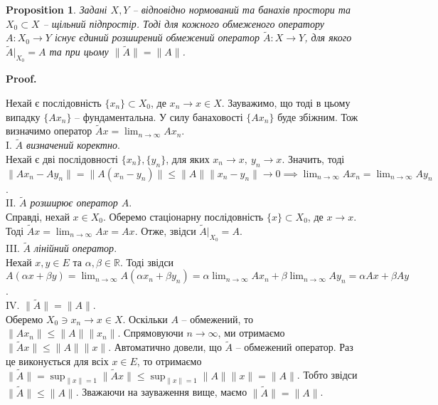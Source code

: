 \documentclass[a4paper, 10pt]{article}
\makeatletter
\theoremstyle{theoremdd}
\theoremstyle{theoremdd}
\theoremstyle{theoremdd}
\theoremstyle{theoremdd}
\theoremstyle{theoremdd}
\newtheorem{proposition}[theorem]{Proposition}
\theoremstyle{theoremdd}
\theoremstyle{theoremdd}
\theoremstyle{theoremdd}
\renewenvironment{proof}[1][Proof.\\]{\par
\pushQED{\hfill \qed}%
\normalfont \topsep6\p@\@plus6\p@\relax
\trivlist
\item\relax
{\bfseries
#1\@addpunct{.}}\hspace\labelsep\ignorespaces
}{%
\popQED\endtrivlist\@endpefalse
}
\makeatother
\begin{document}
\begin{proposition}
Задані $X,Y$ -- відповідно нормований та банахів простори та $X_0 \subset X$ -- щільний підпростір. Тоді для кожного обмеженого оператору $A \colon X_0 \to Y$ існує єдиний розширений обмежений оператор $\tilde{A} \colon X \to Y$, для якого $\tilde{A}|_{X_0} = A$ та при цьому $\|\tilde{A}\| = \|A\|$.
\end{proposition}

\begin{proof}
Нехай є послідовність $\{x_n\} \subset X_0$, де $x_n \to x \in X$. Зауважимо, що тоді в цьому випадку $\{Ax_n\}$ -- фундаментальна. У силу банаховості $\{Ax_n\}$ буде збіжним. Тож визначимо оператор $\tilde{A}x = \displaystyle\lim_{n \to \infty} Ax_n$.\\
I. \textit{$\tilde{A}$ визначений коректно}.\\
Нехай є дві послідовності $\{x_n\},\{y_n\}$, для яких $x_n \to x,\ y_n \to x$. Значить, тоді\\
$\|Ax_n - Ay_n\| = \|A(x_n-y_n)\| \leq \|A\| \|x_n-y_n\| \to 0 \implies \displaystyle\lim_{n \to \infty} Ax_n = \lim_{n \to \infty} Ay_n$.
\bigskip \\
II. \textit{$\tilde{A}$ розширює оператор $A$}.\\
Справді, нехай $x \in X_0$. Оберемо стаціонарну послідовність $\{x\} \subset X_0$, де $x \to x$. Тоді $\tilde{A}x = \displaystyle\lim_{n \to \infty} Ax = Ax$. Отже, звідси $\tilde{A}|_{X_0} = A$.
\bigskip \\
III. \textit{$\tilde{A}$ лінійний оператор}.\\
Нехай $x,y \in E$ та $\alpha,\beta \in \mathbb{R}$. Тоді звідси\\
$A(\alpha x + \beta y) = \displaystyle\lim_{n \to \infty} A(\alpha x_n + \beta y_n) = \alpha \lim_{n \to \infty} Ax_n + \beta \lim_{n \to \infty} Ay_n = \alpha Ax + \beta Ay$.
\bigskip \\
\iffalse
IV. \textit{$\tilde{A}$ -- обмежений оператор}.\\
Оберемо послідовність $\{x_n\} \subset X$ так, що $x_n \to 0$. Тоді\\
$\|\tilde{A}x_n\| = \displaystyle \| \lim_{m \to \infty} A x_n^{(m)} \| = \lim_{m \to \infty} \|A x_n^{(m)}\| \leq \lim_{m \to \infty} \|A\| \|x_n^{(m)}\| = \|A\| \| \lim_{m \to \infty} x_n^{(m)} \| = \|A\| \|x_n\| \to 0$ при $n \to \infty \implies \tilde{A}x_n \to A0$.
\bigskip \\
\fi
IV. $\|\tilde{A}\| = \|A\|$.\\
Оберемо $X_0 \ni x_n \to x \in X$. Оскільки $A$ -- обмежений, то $\|Ax_n\| \leq \|A\| \|x_n\|$. Спрямовуючи $n \to \infty$, ми отримаємо $\|\tilde{A}x\| \le \|A\| \|x\|$. Автоматично довели, що $\tilde{A}$ -- обмежений оператор. Раз це виконується для всіх $x \in E$, то отримаємо $\|\tilde{A}\|= \displaystyle\sup_{\|x\| = 1} \|\tilde{A}x\| \leq \sup_{\|x\| = 1} \|A\| \|x\| = \|A\|$. Тобто звідси $\|\tilde{A}\| \leq \|A\|$. Зважаючи на зауваження вище, маємо $\|\tilde{A}\| = \|A\|$.

\end{proof}
\end{document}
